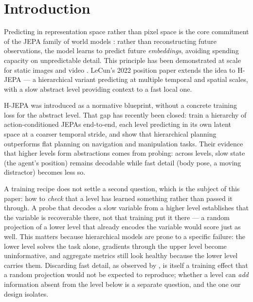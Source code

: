 \documentclass[11pt]{article}
\begin{document}
\section{Introduction}

Predicting in representation space rather than pixel space is the core commitment of the JEPA family of world models \citep{lecun2022path}: rather than reconstructing future observations, the model learns to predict future \emph{embeddings}, avoiding spending capacity on unpredictable detail. This principle has been demonstrated at scale for static images \citep{assran2023ijepa} and video \citep{bardes2024vjepa}. LeCun's 2022 position paper extends the idea to H-JEPA --- a hierarchical variant predicting at multiple temporal and spatial scales, with a slow abstract level providing context to a fast local one.

H-JEPA was introduced as a normative blueprint, without a concrete training loss for the abstract level. That gap has recently been closed: \citet{zhang2026hjepa} train a hierarchy of action-conditioned JEPAs end-to-end, each level predicting in its own latent space at a coarser temporal stride, and show that hierarchical planning outperforms flat planning on navigation and manipulation tasks. Their evidence that higher levels form abstractions comes from probing: across levels, slow state (the agent's position) remains decodable while fast detail (body pose, a moving distractor) becomes less so.

A training recipe does not settle a second question, which is the subject of this paper: how to \emph{check} that a level has learned something rather than passed it through. A probe that decodes a slow variable from a higher level establishes that the variable is recoverable there, not that training put it there --- a random projection of a lower level that already encodes the variable would score just as well. This matters because hierarchical models are prone to a specific failure: the lower level solves the task alone, gradients through the upper level become uninformative, and aggregate metrics still look healthy because the lower level carries them. Discarding fast detail, as observed by \citet{zhang2026hjepa}, is itself a training effect that a random projection would not be expected to reproduce; whether a level can \emph{add} information absent from the level below is a separate question, and the one our design isolates.
\end{document}
